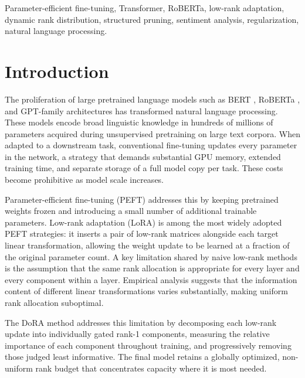 \documentclass[conference]{IEEEtran}
\begin{document}
\begin{IEEEkeywords}
Parameter-efficient fine-tuning, Transformer, RoBERTa,
low-rank adaptation, dynamic rank distribution, structured
pruning, sentiment analysis, regularization, natural language
processing.
\end{IEEEkeywords}

\section{Introduction}

The proliferation of large pretrained language models such as
BERT \cite{devlin2019bert}, RoBERTa \cite{liu2019roberta}, and
GPT-family architectures has transformed natural language
processing. These models encode broad linguistic knowledge in
hundreds of millions of parameters acquired during
unsupervised pretraining on large text corpora. When adapted
to a downstream task, conventional fine-tuning updates every
parameter in the network, a strategy that demands substantial
GPU memory, extended training time, and separate storage of a
full model copy per task. These costs become prohibitive as
model scale increases.

Parameter-efficient fine-tuning (PEFT) addresses this by
keeping pretrained weights frozen and introducing a small
number of additional trainable parameters. Low-rank adaptation
(LoRA) \cite{hu2022lora} is among the most widely adopted PEFT
strategies: it inserts a pair of low-rank matrices alongside
each target linear transformation, allowing the weight update
to be learned at a fraction of the original parameter count.
A key limitation shared by naive low-rank methods is the
assumption that the same rank allocation is appropriate for
every layer and every component within a layer. Empirical
analysis suggests that the information content of different
linear transformations varies substantially, making uniform
rank allocation suboptimal.

The DoRA method \cite{chen2024dora} addresses this limitation
by decomposing each low-rank update into individually gated
rank-1 components, measuring the relative importance of each
component throughout training, and progressively removing
those judged least informative. The final model retains a
globally optimized, non-uniform rank budget that concentrates
capacity where it is most needed.
\end{document}
